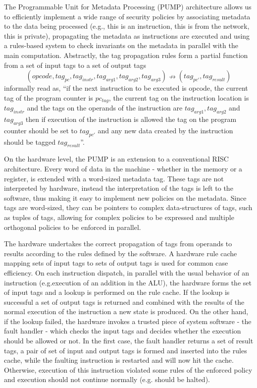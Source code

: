 The Programmable Unit for Metadata Processing (PUMP) architecture
\cite{pump_hasp2014}
allows us to efficiently implement a wide range of security policies 
\cite{pump_ccs2014} by associating metadata to the data being processed 
(e.g., this is an instruction, this is from the network, this is private),
propagating the metadata as instructions are executed and using a rules-based 
system to check invariants on the metadata in parallel with the main computation.
Abstractly, the tag propagation rules form a partial function from a set of 
input tags to a set of output tags
$$(opcode, tag_{pc},tag_{instr}, tag_{arg1}, tag_{arg2}, tag_{arg3})
\nrightarrow (tag_{pc'},tag_{result})$$
informally read as, ``if the next instruction to be executed is opcode, the 
current tag of the program counter is $pc_{tag}$, the current tag on the 
instruction location is $tag_{instr}$ and the tags on the operands of the 
instruction are $tag_{arg1}, tag_{arg2}$ and $tag_{arg3}$ then if execution of 
the instruction is allowed the tag on the program counter should be set
to $tag_{pc'}$ and any new data created by the instruction should be tagged 
$tag_{result}$''.

On the hardware level, the PUMP is an extension to a conventional RISC 
architecture. Every word of data in the machine - whether in the memory 
or a register, is extended with a word-sized metadata tag.
These tags are not interpreted by hardware, instead the interpretation of the 
tags is left to the software, thus making it easy to implement new policies on 
the metadata. Since tags are word-sized, they can be pointers to complex 
data-structures of tags, such as tuples of tags, allowing for complex policies 
to be expressed and multiple orthogonal policies to be enforced in parallel.

The hardware undertakes the correct propagation of tags from operands to results 
according to the rules defined by the software. 
A hardware rule cache mapping sets of input tags to sets of output tags is used 
for common case efficiency. On each instruction dispatch, in parallel 
with the usual behavior of an instruction 
(e.g.execution of an addition in the ALU), the hardware forms the set of input 
tags and a lookup is performed on the rule cache. If the lookup is successful
a set of output tags is returned and combined with the results of the normal 
execution of the  instruction a new state is produced. On the other hand, 
if the lookup failed, the hardware invokes a trusted piece of system software - 
the fault handler - which checks the input tags and decides whether the 
execution should be allowed or not. In the first case, the fault handler returns
a set of result tags, a pair of set of input and output tags is formed and
inserted into the rules cache, while the faulting instruction is restarted 
and will now hit the cache. Otherwise, execution of this instruction violated 
some rules of the enforced policy and execution should not continue normally 
(e.g. should be halted).

